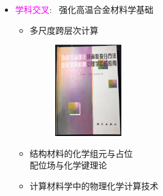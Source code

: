 {\begin{itemize}
\begin{itemize}
\begin{figure}[h!]
\label{TEXT_PPT}
\end{figure}
	\end{itemize}
	\newpage
		\item \textcolor{magenta}{学科交叉}:~ 强化高温合金材料学基础
			\begin{itemize}
				\setlength{\itemsep}{3pt} 
		\item 多尺度跨层次计算
\begin{figure}[h!]
\vspace*{-0.02in}
\centering
\includegraphics[height=1.55in,width=1.15in]{Figures/DFT_Wang.jpg}
\label{DFT_Wang}
\end{figure}
		 \item 结构材料的化学组元与占位\\
			配位场与化学键理论
		 \item 计算材料学中的物理化学计算技术
	\end{itemize}
\end{itemize}
}

